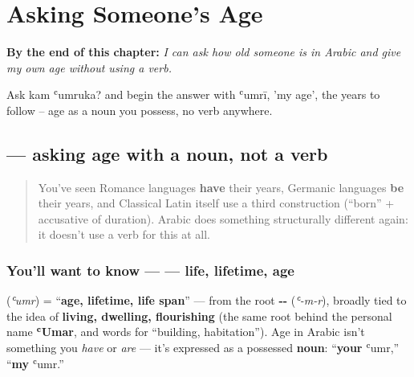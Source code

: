 
\chapter{Asking Someone's Age}
\label{ch:ar-asking-age}

\begin{chapteropening}
\textbf{By the end of this chapter:} \emph{I can ask how old someone is in Arabic and give my own age without using a verb.}

Ask kam ʿumruka? and begin the answer with ʿumrī, 'my age', the years to follow -- age as a noun you possess, no verb anywhere.
\end{chapteropening}

\section[\texorpdfstring{\ar{كم} \ar{عمرك؟} (kam ʿumruka)}{كم عمرك؟ (kam ʿumruka)}]{  — asking age with a noun, not a verb}

\label{lesson:AR-C17-kam-umruka}



\begin{quote}
You've seen Romance languages \textbf{have} their years, Germanic languages \textbf{be} their years, and Classical Latin itself use a third construction (\textquotedblleft{}born\textquotedblright{} + accusative of duration). Arabic does something structurally different again: it doesn't use a verb for this at all.
\end{quote}

\subsection*{You'll want to know —  — life, lifetime, age}
\textbf{} (\emph{ʿumr}) = \textquotedblleft{}\textbf{age, lifetime, life span}\textquotedblright{} — from the root \textbf{--} (\emph{ʿ-m-r}), broadly tied to the idea of \textbf{living, dwelling, flourishing} (the same root behind the personal name \textbf{ʿUmar}, and words for \textquotedblleft{}building, habitation\textquotedblright{}). Age in Arabic isn't something you \emph{have} or \emph{are} — it's expressed as a possessed \textbf{noun}: \textquotedblleft{}\textbf{your} ʿumr,\textquotedblright{} \textquotedblleft{}\textbf{my} ʿumr.\textquotedblright{}

